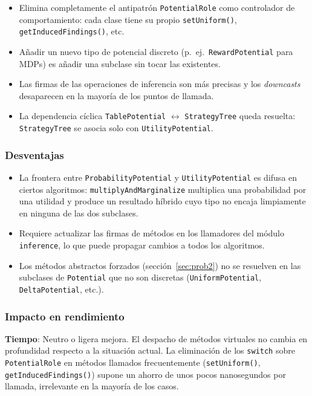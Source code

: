 \documentclass[11pt,a4paper]{article}
\newcommand{\code}[1]{\texttt{#1}}
\begin{document}
\begin{itemize}
  \item Elimina completamente el antipatrón \code{PotentialRole} como controlador
        de comportamiento: cada clase tiene su propio \code{setUniform()},
        \code{getInducedFindings()}, etc.
  \item Añadir un nuevo tipo de potencial discreto (p.~ej.\ \code{RewardPotential}
        para MDPs) es añadir una subclase sin tocar las existentes.
  \item Las firmas de las operaciones de inferencia son más precisas y
        los \emph{downcasts} desaparecen en la mayoría de los puntos de llamada.
  \item La dependencia cíclica \code{TablePotential} $\leftrightarrow$
        \code{StrategyTree} queda resuelta: \code{StrategyTree} se asocia solo
        con \code{UtilityPotential}.
\end{itemize}

\subsubsection*{Desventajas}

\begin{itemize}
  \item La frontera entre \code{ProbabilityPotential} y \code{UtilityPotential} es
        difusa en ciertos algoritmos: \code{multiplyAndMarginalize} multiplica una
        probabilidad por una utilidad y produce un resultado híbrido cuyo tipo no
        encaja limpiamente en ninguna de las dos subclases.
  \item Requiere actualizar las firmas de métodos en los llamadores del módulo
        \code{inference}, lo que puede propagar cambios a todos los algoritmos.
  \item Los métodos abstractos forzados (sección~\ref{sec:prob2}) no se
        resuelven en las subclases de \code{Potential} que no son discretas
        (\code{UniformPotential}, \code{DeltaPotential}, etc.).
\end{itemize}

\subsubsection*{Impacto en rendimiento}

\textbf{Tiempo}: Neutro o ligera mejora.  El despacho de métodos virtuales no
cambia en profundidad respecto a la situación actual.  La eliminación de los
\code{switch} sobre \code{PotentialRole} en métodos llamados frecuentemente
(\code{setUniform()}, \code{getInducedFindings()}) supone un ahorro de unos pocos
nanosegundos por llamada, irrelevante en la mayoría de los casos.
\end{document}
